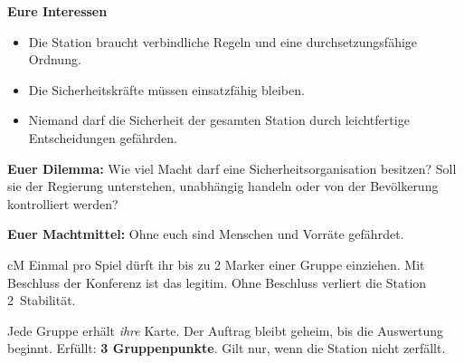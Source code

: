 \medskip\noindent\textbf{Eure Interessen}
\begin{itemize}
  \item Die Station braucht verbindliche Regeln und eine durchsetzungsfähige Ordnung.
  \item Die Sicherheitskräfte müssen einsatzfähig bleiben.
  \item Niemand darf die Sicherheit der gesamten Station durch leichtfertige Entscheidungen gefährden.
\end{itemize}
\textbf{Euer Dilemma:} Wie viel Macht darf eine Sicherheitsorganisation besitzen? Soll sie der Regierung unterstehen, unabhängig handeln oder von der Bevölkerung kontrolliert werden?\par
\textbf{Euer Machtmittel:} Ohne euch sind Menschen und Vorräte gefährdet.\par\medskip
\begin{metrobox}[title={Euer Sonderrecht: die Zwangsmaßnahme},fonttitle=\bfseries]{cM}
Einmal pro Spiel dürft ihr bis zu 2 Marker einer Gruppe einziehen. Mit Beschluss der Konferenz ist das legitim. Ohne Beschluss verliert die Station 2~Stabilität.
\end{metrobox}\par\medskip
{}

\clearpage
{}
Jede Gruppe erhält \emph{ihre} Karte. Der Auftrag bleibt geheim, bis die Auswertung beginnt. Erfüllt: \textbf{3 Gruppenpunkte}. Gilt nur, wenn die Station nicht zerfällt.\par\medskip

